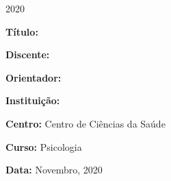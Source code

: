 \documentclass[chapter=TITLE,
               oneside,
               12pt,
               a4paper,
               english,
               brazil]{abntex2}    %
\renewcommand{\ABNTEXchapterfont}{\normalfont\fontseries{b}\selectfont}
\renewcommand{\imprimircapa}{%
    \begin{capa}%
        \center
        \ABNTEXchapterfont\Large\MakeUppercase\imprimirinstituicao

        \vspace*{1cm}

        {\ABNTEXchapterfont\Large\MakeUppercase\imprimirautor}

        \vfill
        \begin{center}
            \ABNTEXchapterfont\bfseries\LARGE\MakeUppercase\imprimirtitulo
        \end{center}
        \vfill

        \large\imprimirlocal

        \large{2020}

        \vspace*{1cm}
    \end{capa}
}
\begin{document}
\imprimircapa

\imprimirfolhaderosto

\label{sec:identificacao}

    \begin{itemize}
        \large{
        \item \textbf{Título:} \imprimirtitulo

        \item \textbf{Discente:} \imprimirautor

        \item \textbf{Orientador:} \imprimirorientadorRotulo~\imprimirorientador

        \item \textbf{Instituição:} \imprimirinstituicao
            
        \item \textbf{Centro:} Centro de Ciências da Saúde

        \item \textbf{Curso:} Psicologia

        \item \textbf{Data:} Novembro, 2020
        }
    \end{itemize}
    

\newpage
\begin{KeepFromToc}
\tableofcontents
\end{KeepFromToc}
\newpage
\end{document}
